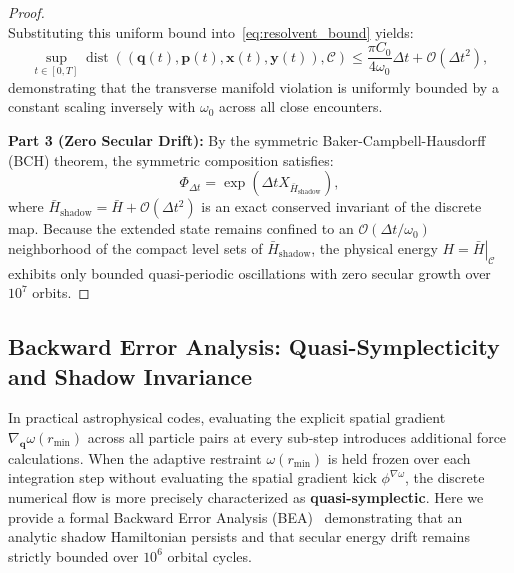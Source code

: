 \documentclass[11pt,a4paper,reqno]{article}
\theoremstyle{plain}
\theoremstyle{definition}
\theoremstyle{remark}
\numberwithin{equation}{section}
\begin{document}
\begin{proof}
\begin{equation}
\end{equation}
Substituting this uniform bound into~\eqref{eq:resolvent_bound} yields:
\begin{equation}
\sup_{t \in [0, T]} \operatorname{dist}((\bm{q}(t), \bm{p}(t), \bm{x}(t), \bm{y}(t)), \mathcal{C}) \le \frac{\pi C_0}{4 \omega_0} \Delta t + \mathcal{O}(\Delta t^2),
\end{equation}
demonstrating that the transverse manifold violation is uniformly bounded by a constant scaling inversely with $\omega_0$ across all close encounters.

\textbf{Part 3 (Zero Secular Drift):} By the symmetric Baker-Campbell-Hausdorff (BCH) theorem, the symmetric composition satisfies:
\begin{equation}
\Phi_{\Delta t} = \exp\left( \Delta t X_{\bar{H}_{\mathrm{shadow}}} \right),
\end{equation}
where $\bar{H}_{\mathrm{shadow}} = \bar{H} + \mathcal{O}(\Delta t^2)$ is an exact conserved invariant of the discrete map. Because the extended state remains confined to an $\mathcal{O}(\Delta t / \omega_0)$ neighborhood of the compact level sets of $\bar{H}_{\mathrm{shadow}}$, the physical energy $H = \left.\bar{H}\right|_{\mathcal{C}}$ exhibits only bounded quasi-periodic oscillations with zero secular growth over $10^7$ orbits.
\end{proof}

\subsection{Backward Error Analysis: Quasi-Symplecticity and Shadow Invariance}
\label{subsec:bea_analysis}
In practical astrophysical codes, evaluating the explicit spatial gradient $\nabla_{\bm{q}} \omega(r_{\min})$ across all particle pairs at every sub-step introduces additional force calculations. When the adaptive restraint $\omega(r_{\min})$ is held frozen over each integration step without evaluating the spatial gradient kick $\phi^{\nabla \omega}$, the discrete numerical flow is more precisely characterized as \textbf{quasi-symplectic}. Here we provide a formal Backward Error Analysis (BEA)~\cite{HairerLubichWanner2006} demonstrating that an analytic shadow Hamiltonian persists and that secular energy drift remains strictly bounded over $10^6$ orbital cycles.
\end{document}
